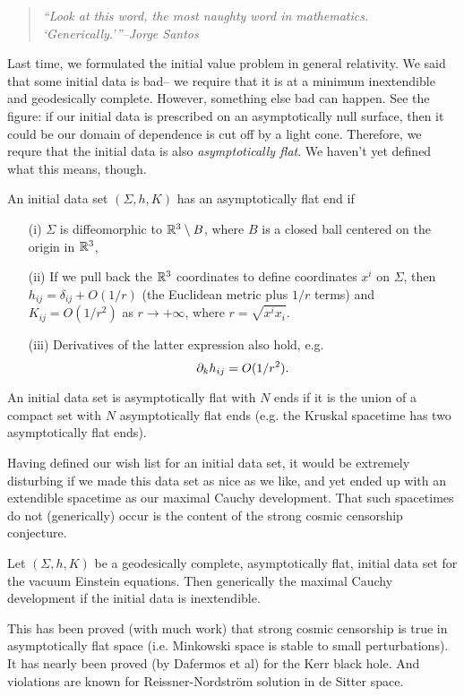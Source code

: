 \begin{quote}
    \textit{``Look at this word, the most naughty word in mathematics. `Generically.'{}''--Jorge Santos}
\end{quote}

Last time, we formulated the initial value problem in general relativity. We said that some initial data is bad-- we require that it is at a minimum inextendible and geodesically complete. However, something else bad can happen. See the figure:
if our initial data is prescribed on an asymptotically null surface, then it could be our domain of dependence is cut off by a light cone. Therefore, we requre that the initial data is also \emph{asymptotically flat}. We haven't yet defined what this means, though.

\begin{defn}
    An initial data set $(\Sigma,h,K)$ has an asymptotically flat end if
    \begin{itemize}
        \item[(i)] $\Sigma$ is diffeomorphic to $\mathbb{R}^3 \setminus B$, where $B$ is a closed ball centered on the origin in $\mathbb{R}^3$,
        \item[(ii)] If we pull back the $\mathbb{R}^3$ coordinates to define coordinates $x^i$ on $\Sigma$, then $h_{ij}=\delta_{ij}+O(1/r)$ (the Euclidean metric plus $1/r$ terms) and $K_{ij}=O(1/r^2)$ as $r\to +\infty$, where $r=\sqrt{x^i x_i}$.
        \item[(iii)] Derivatives of the latter expression also hold, e.g.
        \begin{equation*}
            \partial_k h_{ij}=O(1/r^2).
        \end{equation*}
    \end{itemize}
\end{defn}
\begin{defn}
    An initial data set is asymptotically flat with $N$ ends if it is the union of a compact set with $N$ asymptotically flat ends (e.g. the Kruskal spacetime has two asymptotically flat ends).
\end{defn}
Having defined our wish list for an initial data set, it would be extremely disturbing if we made this data set as nice as we like, and yet ended up with an extendible spacetime as our maximal Cauchy development. That such spacetimes do not (generically) occur is the content of the strong cosmic censorship conjecture.
\begin{thm}
    Let $(\Sigma,h,K)$ be a geodesically complete, asymptotically flat, initial data set for the vacuum Einstein equations. Then generically the maximal Cauchy development if the initial data is inextendible.
\end{thm}
This has been proved (with much work) that strong cosmic censorship is true in asymptotically flat space (i.e. Minkowski space is stable to small perturbations). It has nearly been proved (by Dafermos et al) for the Kerr black hole. And violations are known for Reissner-Nordstr\"om solution in de Sitter space.

